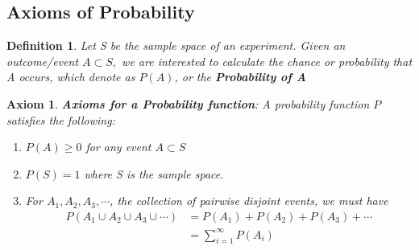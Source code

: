 \documentclass[11pt,oneside]{book}
\theoremstyle{newStyle}
\newtheorem{axiom}[thm]{Axiom}
\newtheorem{defn}[thm]{Definition}
\begin{document}
\subsection[Axioms of Probability]{Axioms of Probability}
\begin{defn}
Let S be the sample space of an experiment. Given an outcome/event $A\subset S,$ we are interested to calculate the chance or probability that A occurs, which denote as $P(A)$, or the \textbf{Probability of A}
\end{defn}
\begin{axiom}
\textbf{Axioms for a Probability function}: A probability function $P$ satisfies the following:\begin{enumerate}
[itemsep=0pt, topsep=1pt, partopsep=0pt,label=(\roman*)]
\item $P(A)\geq 0$ for any event $A\subset S$
\item $P(S)=1$ where S is the sample space.
\item For $A_1,A_2,A_3,\cdots$, the collection of pairwise disjoint events, we must have \begin{align*}
P(A_1\cup A_2\cup A_3\cup \cdots)&=P(A_1)+P(A_2)+P(A_3)+\cdots\\
&=\sum_{i=1}^{\infty}P(A_i)
\end{align*}
\end{enumerate}
\end{axiom}
\end{document}

